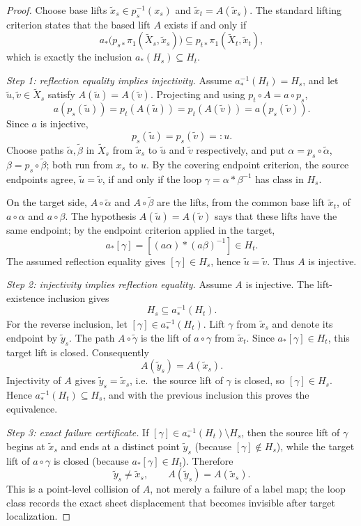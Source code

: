 \begin{proof}
Choose base lifts \(\widetilde x_s\in p_s^{-1}(x_s)\) and
\(\widetilde x_t=A(\widetilde x_s)\).  The standard lifting criterion
states that the based lift \(A\) exists if and only if
\[
 a_*\bigl(p_{s*}\pi_1(\widetilde X_s,\widetilde x_s)\bigr)
 \subseteq
 p_{t*}\pi_1(\widetilde X_t,\widetilde x_t),
\]
which is exactly the inclusion \(a_*(H_s)\subseteq H_t\).

\emph{Step 1: reflection equality implies injectivity.}
Assume \(a_*^{-1}(H_t)=H_s\), and let
\(\widetilde u,\widetilde v\in\widetilde X_s\) satisfy
\(A(\widetilde u)=A(\widetilde v)\).  Projecting and using
\(p_t\circ A=a\circ p_s\),
\[
 a(p_s(\widetilde u))=p_t(A(\widetilde u))=p_t(A(\widetilde v))
 =a(p_s(\widetilde v)).
\]
Since \(a\) is injective,
\[
 p_s(\widetilde u)=p_s(\widetilde v)=:u .
\]
Choose paths \(\widetilde\alpha,\widetilde\beta\) in
\(\widetilde X_s\) from \(\widetilde x_s\) to \(\widetilde u\) and
\(\widetilde v\) respectively, and put
\(\alpha=p_s\circ\widetilde\alpha\),
\(\beta=p_s\circ\widetilde\beta\); both run from \(x_s\) to \(u\).
By the covering endpoint criterion, the source endpoints agree,
\(\widetilde u=\widetilde v\), if and only if the loop
\(\gamma=\alpha*\beta^{-1}\) has class in \(H_s\).

On the target side, \(A\circ\widetilde\alpha\) and
\(A\circ\widetilde\beta\) are the lifts, from the common base lift
\(\widetilde x_t\), of \(a\circ\alpha\) and \(a\circ\beta\).  The
hypothesis \(A(\widetilde u)=A(\widetilde v)\) says that these lifts
have the same endpoint; by the endpoint criterion applied in the
target,
\[
 a_*[\gamma]=[(a\alpha)*(a\beta)^{-1}]\in H_t .
\]
The assumed reflection equality gives \([\gamma]\in H_s\), hence
\(\widetilde u=\widetilde v\).  Thus \(A\) is injective.

\emph{Step 2: injectivity implies reflection equality.}
Assume \(A\) is injective.  The lift-existence inclusion gives
\[
 H_s\subseteq a_*^{-1}(H_t).
\]
For the reverse inclusion, let \([\gamma]\in a_*^{-1}(H_t)\).  Lift
\(\gamma\) from \(\widetilde x_s\) and denote its endpoint by
\(\widetilde y_s\).  The path \(A\circ\widetilde\gamma\) is the lift
of \(a\circ\gamma\) from \(\widetilde x_t\).  Since
\(a_*[\gamma]\in H_t\), this target lift is closed.  Consequently
\[
 A(\widetilde y_s)=A(\widetilde x_s).
\]
Injectivity of \(A\) gives \(\widetilde y_s=\widetilde x_s\), i.e.\ 
the source lift of \(\gamma\) is closed, so \([\gamma]\in H_s\).
Hence \(a_*^{-1}(H_t)\subseteq H_s\), and with the previous inclusion
this proves the equivalence.

\emph{Step 3: exact failure certificate.}
If \([\gamma]\in a_*^{-1}(H_t)\setminus H_s\), then the source lift of
\(\gamma\) begins at \(\widetilde x_s\) and ends at a distinct point
\(\widetilde y_s\) (because \([\gamma]\notin H_s\)), while the target
lift of \(a\circ\gamma\) is closed (because \(a_*[\gamma]\in H_t\)).
Therefore
\[
 \widetilde y_s\neq\widetilde x_s,
 \qquad
 A(\widetilde y_s)=A(\widetilde x_s).
\]
This is a point-level collision of \(A\), not merely a failure of a
label map; the loop class records the exact sheet displacement that
becomes invisible after target localization.
\end{proof}